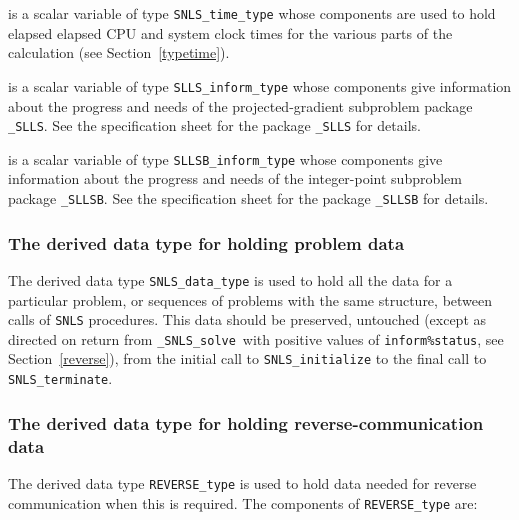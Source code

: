 \documentclass{galahad}
\newcommand{\packagename}{SNLS}
\newcommand{\fullpackagename}{\libraryname\_\packagename}
\newcommand{\solver}{{\tt \fullpackagename\_solve}}
\begin{document}
\begin{description}
 is a scalar variable of type {\tt \packagename\_time\_type}
whose components are used to hold elapsed elapsed CPU and system clock
times for the various parts of the calculation (see Section~\ref{typetime}).

 is a scalar variable of type
{\tt SLLS\_inform\_type}
whose components give information about the progress and needs
of the projected-gradient subproblem package
{\tt \libraryname\_SLLS}.
See the specification sheet for the package
{\tt \libraryname\_SLLS}
for details.

 is a scalar variable of type
{\tt SLLSB\_inform\_type}
whose components give information about the progress and needs
of the integer-point subproblem package
{\tt \libraryname\_SLLSB}.
See the specification sheet for the package
{\tt \libraryname\_SLLSB}
for details.

\end{description}


\subsubsection{The derived data type for holding problem data}\label{typedata}
The derived data type
{\tt \packagename\_data\_type}
is used to hold all the data for a particular problem,
or sequences of problems with the same structure, between calls of
{\tt \packagename} procedures.
This data should be preserved, untouched (except as directed on
return from \solver\ with positive values of {\tt inform\%status}, see
Section~\ref{reverse}),
from the initial call to
{\tt \packagename\_initialize}
to the final call to
{\tt \packagename\_terminate}.





\subsubsection{The derived data type for holding reverse-communication data}\label{typereverse}
The derived data type
{\tt REVERSE\_type}
is used to hold data needed for reverse communication when this is
required.
The components of
{\tt REVERSE\_type}
are:
\end{document}
